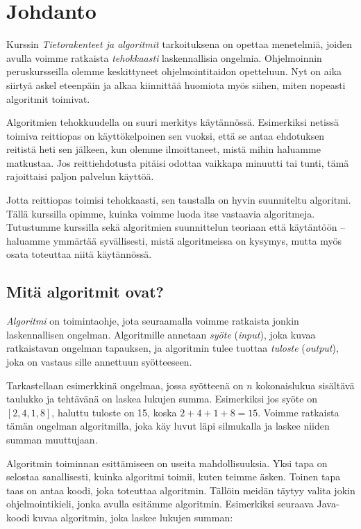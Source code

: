 \chapter{Johdanto}

Kurssin \emph{Tietorakenteet ja algoritmit} tarkoituksena
on opettaa menetelmiä, joiden avulla voimme ratkaista
\emph{tehokkaasti} laskennallisia ongelmia.
Ohjelmoinnin peruskursseilla olemme keskittyneet
ohjelmointitaidon opetteluun.
Nyt on aika siirtyä askel eteenpäin ja alkaa kiinnittää
huomiota myös siihen, miten nopeasti algoritmit toimivat.

Algoritmien tehokkuudella on suuri merkitys käytännössä.
Esimerkiksi netissä toimiva reittiopas on käyttökelpoinen sen vuoksi,
että se antaa ehdotuksen reitistä heti sen jälkeen, kun olemme
ilmoittaneet, mistä mihin haluamme matkustaa.
Jos reittiehdotusta pitäisi odottaa vaikkapa minuutti tai tunti,
tämä rajoittaisi paljon palvelun käyttöä.

Jotta reittiopas toimisi tehokkaasti, sen taustalla on
hyvin suunniteltu algoritmi.
Tällä kurssilla opimme, kuinka voimme luoda itse vastaavia algoritmeja.
Tutustumme kurssilla sekä algoritmien suunnittelun teoriaan että
käytäntöön -- haluamme ymmärtää syvällisesti, mistä algoritmeissa on kysymys,
mutta myös osata toteuttaa niitä käytännössä.

\section{Mitä algoritmit ovat?}


\emph{Algoritmi} on toimintaohje, jota seuraamalla voimme ratkaista
jonkin laskennallisen ongelman.
Algoritmille annetaan \emph{syöte} (\emph{input}),
joka kuvaa ratkaistavan ongelman tapauksen,
ja algoritmin tulee tuottaa \emph{tuloste} (\emph{output}),
joka on vastaus sille annettuun syötteeseen.

Tarkastellaan esimerkkinä ongelmaa,
jossa syötteenä on $n$ kokonaislukua sisältävä taulukko ja
tehtävänä on laskea lukujen summa.
Esimerkiksi jos syöte on $[2,4,1,8]$,
haluttu tuloste on 15, koska $2+4+1+8=15$.
Voimme ratkaista tämän ongelman algoritmilla,
joka käy luvut läpi silmukalla ja laskee niiden
summan muuttujaan.

Algoritmin toiminnan esittämiseen on useita mahdollisuuksia.
Yksi tapa on selostaa sanallisesti, kuinka algoritmi toimii,
kuten teimme äsken.
Toinen tapa taas on antaa koodi, joka toteuttaa algoritmin.
Tällöin meidän täytyy valita jokin ohjelmointikieli,
jonka avulla esitämme algoritmin.
Esimerkiksi seuraava Java-koodi kuvaa algoritmin,
joka laskee lukujen summan:

